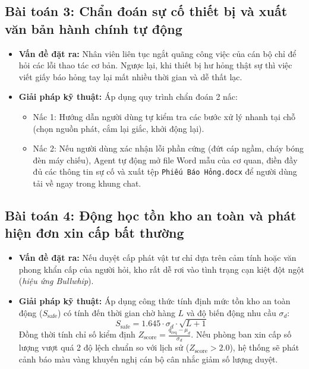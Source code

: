 \documentclass[11pt,a4paper]{article}
\begin{document}
\subsection{Bài toán 3: Chẩn đoán sự cố thiết bị và xuất văn bản hành chính tự động}
\begin{itemize}
    \item \textbf{Vấn đề đặt ra:} Nhân viên liên tục ngắt quãng công việc của cán bộ chỉ để hỏi các lỗi thao tác cơ bản. Ngược lại, khi thiết bị hư hỏng thật sự thì việc viết giấy báo hỏng tay lại mất nhiều thời gian và dễ thất lạc.
    \item \textbf{Giải pháp kỹ thuật:} Áp dụng quy trình chẩn đoán 2 nấc:
    \begin{itemize}
        \item Nấc 1: Hướng dẫn người dùng tự kiểm tra các bước xử lý nhanh tại chỗ (chọn nguồn phát, cắm lại giắc, khởi động lại).
        \item Nấc 2: Nếu người dùng xác nhận lỗi phần cứng (đứt cáp ngầm, cháy bóng đèn máy chiếu), Agent tự động mở file Word mẫu của cơ quan, điền đầy đủ các thông tin sự cố và xuất tệp \texttt{Phiếu Báo Hỏng.docx} để người dùng tải về ngay trong khung chat.
    \end{itemize}
\end{itemize}

\subsection{Bài toán 4: Động học tồn kho an toàn và phát hiện đơn xin cấp bất thường}
\begin{itemize}
    \item \textbf{Vấn đề đặt ra:} Nếu duyệt cấp phát vật tư chỉ dựa trên cảm tính hoặc văn phong khẩn cấp của người hỏi, kho rất dễ rơi vào tình trạng cạn kiệt đột ngột (\textit{hiệu ứng Bullwhip}).
    \item \textbf{Giải pháp kỹ thuật:} Áp dụng công thức tính định mức tồn kho an toàn động ($S_{\text{safe}}$) có tính đến thời gian chờ hàng $L$ và độ biến động nhu cầu $\sigma_d$:
    \begin{equation}
        S_{\text{safe}} = 1.645 \cdot \sigma_d \cdot \sqrt{L + 1}
    \end{equation}
    Đồng thời tính chỉ số kiểm định $Z_{\text{score}} = \frac{q_{\text{req}} - \mu_d}{\sigma_d}$. Nếu phòng ban xin cấp số lượng vượt quá 2 độ lệch chuẩn so với lịch sử ($Z_{\text{score}} > 2.0$), hệ thống sẽ phát cảnh báo màu vàng khuyến nghị cán bộ cân nhắc giảm số lượng duyệt.
\end{itemize}
\end{document}
